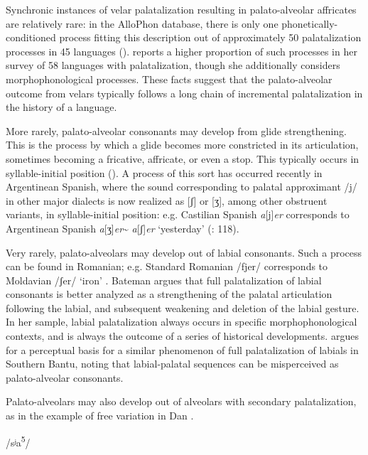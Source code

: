   Synchronic instances of velar palatalization resulting in palato-alveolar affricates are relatively rare: in the AlloPhon database, there is only one phonetically-conditioned process fitting this description out of approximately 50 palatalization processes in 45 languages (\citealt{BybeeEasterday2019}). \citet{Bateman2007} reports a higher proportion of such processes in her survey of 58 languages with palatalization, though she additionally considers morphophonological processes. These facts suggest that the palato-alveolar outcome from velars typically follows a long chain of incremental palatalization in the history of a language.

  More rarely, palato-alveolar consonants may develop from glide strengthening. This is the process by which a glide becomes more constricted in its articulation, sometimes becoming a fricative, affricate, or even a stop. This typically occurs in syllable-initial position (\citealt{BybeeEasterday2019}). A process of this sort has occurred recently in Argentinean Spanish, where the sound corresponding to palatal approximant /j/ in other major dialects is now realized as [ʃ] or [ʒ], among other obstruent variants, in syllable-initial position: e.g. Castilian Spanish \textit{a}[j]\textit{er} corresponds to Argentinean Spanish \textit{a}[ʒ]\textit{er}{\textasciitilde} \textit{a}[ʃ]\textit{er} ‘yesterday’ (\citealt{HarrisKaisse1999}: 118).

  Very rarely, palato-alveolars may develop out of labial consonants. Such a process can be found in Romanian; e.g. Standard Romanian /fjer/ corresponds to Moldavian /ʃer/ ‘iron’ \citep[108]{Bateman2007}. Bateman argues that full palatalization of labial consonants is better analyzed as a strengthening of the palatal articulation following the labial, and subsequent weakening and deletion of the labial gesture. In her sample, labial palatalization always occurs in specific morphophonological contexts, and is always the outcome of a series of historical developments. \citet{Ohala1978} argues for a perceptual basis for a similar phenomenon of full palatalization of labials in Southern Bantu, noting that labial-palatal sequences can be misperceived as palato-alveolar consonants.

  Palato-alveolars may also develop out of alveolars with secondary palatalization, as in the example of free variation in Dan .

\ea\label{ex:4.38}

/sʲa\textsuperscript{5}/


